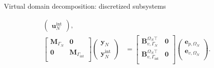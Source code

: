 \documentclass[aspectratio=169]{ISAE-Beamer}
\renewcommand{\div}{\operatorname{div}}
\begin{document}
\begin{frame}{Virtual domain decomposition: discretized subsystems}
\begin{tcolorbox}[colframe=red,title=Subdomain $\Omega_N$ (I.B.P. $\div$), coltitle=white]
\begin{equation*}
\begin{aligned}
\begin{pmatrix}
	\mathbf{u}_N^{\text{int}}
	\end{pmatrix}, \\
	\begin{bmatrix}
	\mathbf{M}_{\Gamma_N} & \mathbf{0} \\
	\mathbf{0} & \mathbf{M}_{\Gamma_{\text{int}}} \\
	\end{bmatrix}
	\begin{pmatrix}
	\mathbf{y}_N \\
	\mathbf{y}_N^{\text{int}}
	\end{pmatrix} &=
	\begin{bmatrix}
	\mathbf{B}_{v, \Gamma_{N}}^{\Omega_N \top} & \mathbf{0} \\ 
	\mathbf{B}_{v, \Gamma_{\text{int}}}^{\Omega_N \top} & \mathbf{0}\\ 
	\end{bmatrix}
	\begin{pmatrix}
	{\mathbf{e}}_{p, \Omega_N} \\
	{\mathbf{e}}_{v, \Omega_N} \\
	\end{pmatrix}.
	\end{aligned}
	\end{equation*}
\end{tcolorbox}
\end{frame}
\end{document}
